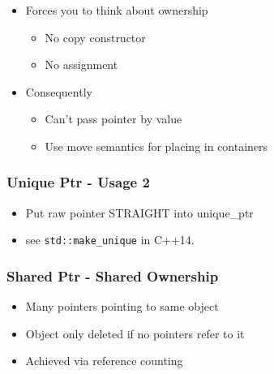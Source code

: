 \begin{itemize}
\itemsep1pt\parskip0pt
\item
  Forces you to think about ownership

  \begin{itemize}
  \itemsep1pt\parskip0pt
  \item
    No copy constructor
  \item
    No assignment
  \end{itemize}
\item
  Consequently

  \begin{itemize}
  \itemsep1pt\parskip0pt
  \item
    Can't pass pointer by value
  \item
    Use move semantics for placing in containers
  \end{itemize}
\end{itemize}

\subsubsection{Unique Ptr - Usage 2}\label{unique-ptr---usage-2}

\begin{itemize}
\itemsep1pt\parskip0pt
\item
  Put raw pointer STRAIGHT into unique\_ptr
\item
  see \texttt{std::make\_unique} in C++14.
\end{itemize}

\begin{Shaded}
\begin{Highlighting}[]
 
   \NormalTok{,}\NormalTok{));}
\NormalTok{\}}

\end{Highlighting}
\end{Shaded}

\subsubsection{Shared Ptr - Shared
Ownership}\label{shared-ptr---shared-ownership}

\begin{itemize}
\itemsep1pt\parskip0pt
\item
  Many pointers pointing to same object
\item
  Object only deleted if no pointers refer to it
\item
  Achieved via reference counting
\end{itemize}

